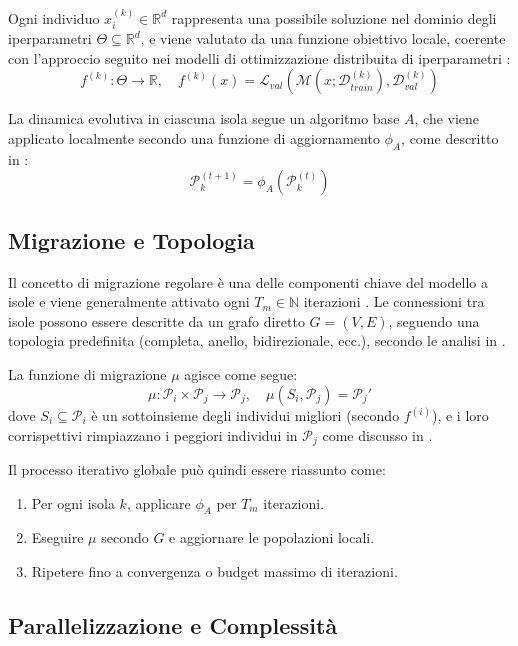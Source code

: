 \documentclass{article}
\begin{document}
Ogni individuo $x_i^{(k)} \in \mathbb{R}^d$ rappresenta una possibile soluzione nel dominio degli 
iperparametri $\Theta \subseteq \mathbb{R}^d$, e viene valutato da una funzione obiettivo locale, 
coerente con l'approccio seguito nei modelli di ottimizzazione distribuita di iperparametri \cite{li2019openbox}:
\[
f^{(k)} : \Theta \to \mathbb{R}, \quad f^{(k)}(x) = \mathcal{L}_{val}(\mathcal{M}(x; \mathcal{D}_{train}^{(k)}), \mathcal{D}_{val}^{(k)})
\]

La dinamica evolutiva in ciascuna isola segue un algoritmo base $A$, che viene applicato localmente 
secondo una funzione di aggiornamento $\phi_A$, come descritto in \cite{kennedy1995particle, engelbrecht2007computational}:
\[
\mathcal{P}_k^{(t+1)} = \phi_A(\mathcal{P}_k^{(t)})
\]

\subsection{Migrazione e Topologia}

Il concetto di migrazione regolare è una delle componenti chiave del modello a isole e viene 
generalmente attivato ogni $T_m \in \mathbb{N}$ iterazioni \cite{tomassini2005spatially}. 
Le connessioni tra isole possono essere descritte da un grafo diretto $G = (V, E)$, seguendo una 
topologia predefinita (completa, anello, bidirezionale, ecc.), secondo le analisi in \cite{cantupaz1998survey}.

La funzione di migrazione $\mu$ agisce come segue:
\[
\mu: \mathcal{P}_i \times \mathcal{P}_j \rightarrow \mathcal{P}_j, \quad \mu(S_i, \mathcal{P}_j) = \mathcal{P}_j'
\]
dove $S_i \subseteq \mathcal{P}_i$ è un sottoinsieme degli individui migliori (secondo $f^{(i)}$), e i loro 
corrispettivi rimpiazzano i peggiori individui in $\mathcal{P}_j$ come discusso in \cite{alba2002parallelism}.

Il processo iterativo globale può quindi essere riassunto come:

\begin{enumerate}
    \item Per ogni isola $k$, applicare $\phi_A$ per $T_m$ iterazioni.
    \item Eseguire $\mu$ secondo $G$ e aggiornare le popolazioni locali.
    \item Ripetere fino a convergenza o budget massimo di iterazioni.
\end{enumerate}

\subsection{Parallelizzazione e Complessità}
\end{document}
